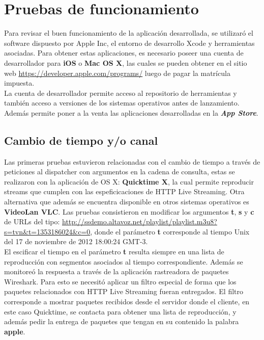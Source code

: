 
\chapter{Pruebas de funcionamiento}

Para revisar el buen funcionamiento de la aplicación desarrollada, se utilizaró el software dispuesto por Apple Inc,  el entorno de desarrollo Xcode y herramientas asociadas. Para obtener estas aplicaciones, es necesario poseer una cuenta de desarrollador para \textbf{iOS} o \textbf{Mac OS X}, las cuales se pueden obtener en el sitio web \url{https://developer.apple.com/programs/} luego de pagar la matrícula impuesta.\\

La cuenta de desarrollador permite acceso al repositorio de herramientas \cite{apple-repositorio} y también acceso a versiones de los sistemas operativos antes de lanzamiento.
Además permite poner a la venta las aplicaciones desarrolladas en la \textit{\textbf{App Store}}\cite{apple-appstore}.

\section{Cambio de tiempo y/o canal}

Las primeras pruebas estuvieron relacionadas con el cambio de tiempo a través de peticiones al dispatcher con argumentos en la cadena de consulta, estas se realizaron con la aplicación de OS X: \textbf{Quicktime X}, la cual permite reproducir streams que cumplen con las espeficicaciones de HTTP Live Streaming. Otra alternativa que además se encuentra disponible en otros sistemas operativos es \textbf{VideoLan VLC}. Las pruebas consistieron en modificar los argumentos \textbf{t}, \textbf{s} y \textbf{c} de URLs del tipo:
\url{http://ssdemo.altavoz.net/playlist/playlist.m3u8?s=tvn&t=1353186024&c=0}, donde el parámetro \textbf{t} corresponde al tiempo Unix del 17 de noviembre de 2012 18:00:24 GMT-3.\\

El escificar el tiempo en el parámetro \textbf{t} resulta siempre en una lista de reproducción con segmentos asociados al tiempo correspondiente. Además se monitoreó la respuesta a través de la aplicación rastreadora de paquetes Wireshark. Para esto se necesitó aplicar un filtro especial de forma que los paquetes relacionados con HTTP Live Streaming fueran entregados. El filtro corresponde a mostrar paquetes recibidos desde el servidor donde el cliente, en este caso Quicktime, se contacta para obtener una lista de reproducción, y además pedir la entrega de paquetes que tengan en su contenido la palabra \textbf{apple}.


